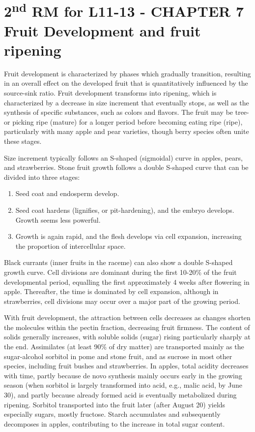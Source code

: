 \section{\texorpdfstring{2\textsuperscript{nd} RM for L11-13 - CHAPTER 7 Fruit Development and fruit ripening}{2nd RM for L11-13 - CHAPTER 7 Fruit Development and fruit ripening}}

Fruit development is characterized by phases which gradually transition, resulting in an overall effect on the developed fruit that is quantitatively influenced by the source-sink ratio. Fruit development transforms into ripening, which is characterized by a decrease in size increment that eventually stops, as well as the synthesis of specific substances, such as colors and flavors. The fruit may be tree- or picking ripe (mature) for a longer period before becoming eating ripe (ripe), particularly with many apple and pear varieties, though berry species often unite these stages.

\vspace{0.5em}
Size increment typically follows an S-shaped (sigmoidal) curve in apples, pears, and strawberries. Stone fruit growth follows a double S-shaped curve that can be divided into three stages: 

\begin{enumerate} 
    \item Seed coat and endosperm develop. 
    \item Seed coat hardens (lignifies, or pit-hardening), and the embryo develops. Growth seems less powerful. 
    \item Growth is again rapid, and the flesh develops via cell expansion, increasing the proportion of intercellular space. 
\end{enumerate} 

\vspace{0.5em}
Black currants (inner fruits in the raceme) can also show a double S-shaped growth curve. Cell divisions are dominant during the first 10-20\% of the fruit developmental period, equalling the first approximately 4 weeks after flowering in apple. Thereafter, the time is dominated by cell expansion, although in strawberries, cell divisions may occur over a major part of the growing period.

\vspace{0.5em}
With fruit development, the attraction between cells decreases as changes shorten the molecules within the pectin fraction, decreasing fruit firmness. The content of solids generally increases, with soluble solids (sugar) rising particularly sharply at the end. Assimilates (at least 90\% of dry matter) are transported mainly as the sugar-alcohol sorbitol in pome and stone fruit, and as sucrose in most other species, including fruit bushes and strawberries. In apples, total acidity decreases with time, partly because de novo synthesis mainly occurs early in the growing season (when sorbitol is largely transformed into acid, e.g., malic acid, by June 30), and partly because already formed acid is eventually metabolized during ripening. Sorbitol transported into the fruit later (after August 20) yields especially sugars, mostly fructose. Starch accumulates and subsequently decomposes in apples, contributing to the increase in total sugar content.

